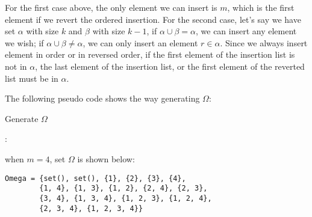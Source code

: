 \documentclass[11pt]{article}
\begin{document}
For the first case above, the only element we can insert is $m$, which is the first element if we revert the ordered insertion. For the second case, let's say we have set $\alpha$ with size $k$ and $\beta$ with size $k-1$, if $\alpha \cup \beta = \alpha$, we can insert any element we wish; if $\alpha \cup \beta \neq \alpha$, we can only insert an element $r \in \alpha$. Since we always insert element in order or in reversed order, if the first element of the insertion list is not in $\alpha$, the last element of the insertion list, or the first element of the reverted list must be in $\alpha$.

The following pseudo code shows the way generating $\Omega$: 

\begin{algorithm}[H] 
    \caption{Generate $\Omega$}
    \label{alg:loop}
    \begin{algorithmic}[1]
    \Ensure{$\Omega$}
                :
                \EndIf
                     
                \EndFor
            \EndFor
        \EndFor
        \State \Return {$\Omega$}
    \end{algorithmic}
\end{algorithm}

when $m=4$, set $\Omega$ is shown below:
\begin{lstlisting}
Omega = {set(), set(), {1}, {2}, {3}, {4}, 
        {1, 4}, {1, 3}, {1, 2}, {2, 4}, {2, 3}, 
        {3, 4}, {1, 3, 4}, {1, 2, 3}, {1, 2, 4}, 
        {2, 3, 4}, {1, 2, 3, 4}}
\end{lstlisting}


\end{document}
